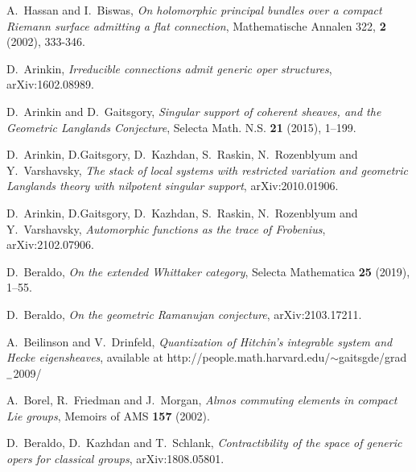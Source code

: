 \documentclass[9pt]{amsart}
\theoremstyle{remark}
\theoremstyle{definition}
\theoremstyle{remark}
\numberwithin{equation}{section}
\begin{document}
\begin{thebibliography}{99}

 A.~Hassan and I.~Biswas, 
{\it On holomorphic principal bundles over a compact Riemann surface admitting a flat connection}, 
Mathematische Annalen 322, {\bf 2} (2002), 333-346.

 D.~Arinkin, {\it Irreducible connections admit generic oper structures}, arXiv:1602.08989.

 D.~Arinkin and D.~Gaitsgory, {\it Singular support of coherent sheaves, and the Geometric Langlands Conjecture}, 
Selecta Math. N.S. {\bf 21} (2015), 1--199.

 D.~Arinkin, D.Gaitsgory, D.~Kazhdan, S.~Raskin, N.~Rozenblyum and Y.~Varshavsky, \newline
{\em The stack of local systems with restricted variation and geometric Langlands theory with nilpotent singular support},
arXiv:2010.01906. 

 D.~Arinkin, D.Gaitsgory, D.~Kazhdan, S.~Raskin, N.~Rozenblyum and Y.~Varshavsky, \newline
{\em Automorphic functions as the trace of Frobenius},
arXiv:2102.07906. 

 D.~Beraldo, 
\emph{On the extended Whittaker category}, 
Selecta Mathematica {\bf 25} (2019), 1--55.

 D.~Beraldo, {\it On the geometric Ramanujan conjecture}, arXiv:2103.17211.

 A.~Beilinson and V.~Drinfeld, {\it Quantization of Hitchin's integrable system and Hecke eigensheaves}, 
available at http://people.math.harvard.edu/$\sim$gaitsgde/grad$\underline{\text{\,\,\,}}$2009/

 A.~Borel, R.~Friedman and J.~Morgan, {\it Almos commuting elements in compact Lie groups}, Memoirs of AMS
{\bf 157} (2002). 

 D.~Beraldo, D.~Kazhdan and T.~Schlank, {\it Contractibility of the space of generic opers for classical groups}, \hfill \newline
 arXiv:1808.05801.





\end{thebibliography}
\end{document}
